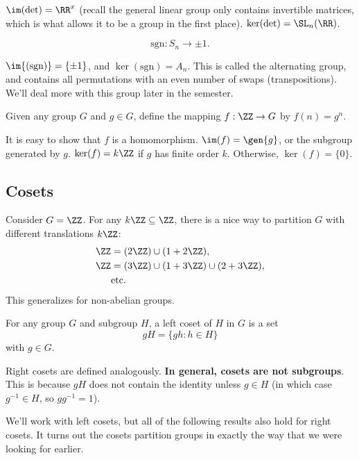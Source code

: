 $\im(\det) = \RR^x$ (recall the general linear group only contains invertible matrices, which is what allows it to be a group in the first place). $\ker(\det) = \SL_n(\RR)$.

\begin{example}
\exlabel
\[\text{sgn}:S_n\rightarrow{\pm 1}.\]
\end{example}

$\im{(\text{sgn})}=\{\pm 1\}$, and $\ker(\text{sgn})=A_n$. This is called the \ac{alternating group}, and contains all permutations with an even number of swaps (transpositions). We'll deal more with this group later in the semester. 

\begin{example}
\exlabel

Given any group $G$ and $g\in G$, define the mapping $f:\ZZ\rightarrow G$ by $f(n)=g^n$. 
\end{example}

It is easy to show that $f$ is a homomorphism. $\im(f)=\gen{g}$, or the subgroup generated by $g$. $\ker(f)=k\ZZ$ if $g$ has finite order $k$. Otherwise, $\ker(f) = \{0\}$. 

\subsection{Cosets}

Consider $G=\ZZ$. For any $k\ZZ\subseteq \ZZ$, there is a nice way to partition $G$ with different translations $k\ZZ$: 
\begin{align*}
    \ZZ &= (2\ZZ)\cup (1+2\ZZ), \\ 
    \ZZ &= (3\ZZ)\cup (1+3\ZZ)\cup (2+3\ZZ), \\
    &\text{etc.}
\end{align*}
This generalizes for non-abelian groups. 
\begin{definition}

For any group $G$ and subgroup $H$, a \ac{left coset} of $H$ in $G$ is a set 
\[gH = \{gh : h\in H\}\] 
with $g\in G$. 
\end{definition}

Right cosets are defined analogously. \textbf{In general, cosets are not subgroups}. This is because $gH$ does not contain the identity unless $g\in H$ (in which case $g^{-1}\in H$, so $gg^{-1}=1$). 

We'll work with left cosets, but all of the following results also hold for right cosets. It turns out the cosets partition groups in exactly the way that we were looking for earlier. 

